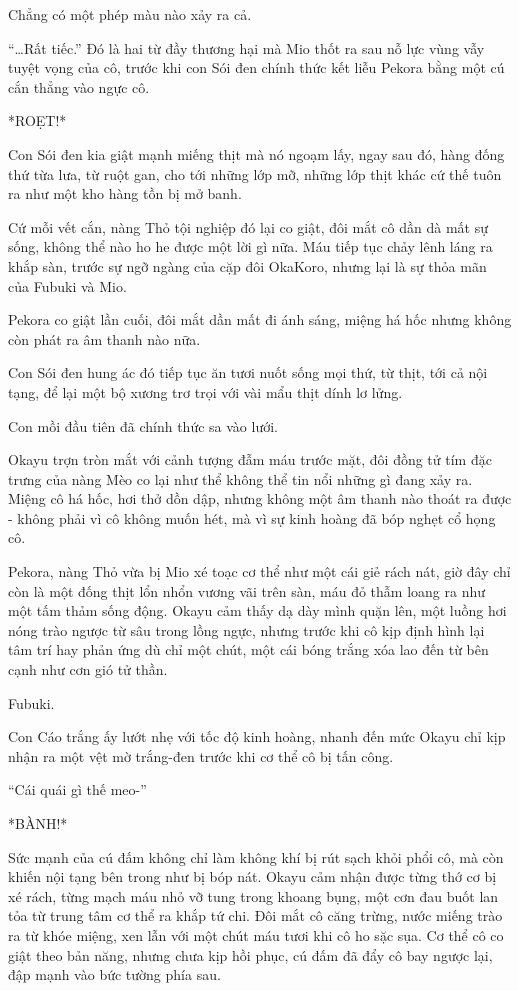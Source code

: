 \documentclass[../main.tex]{subfiles}
\begin{document}
Chẳng có một phép màu nào xảy ra cả.

``\dots Rất tiếc.'' Đó là hai từ đầy thương hại mà Mio thốt ra sau nỗ lực vùng vẫy tuyệt vọng của cô, trước khi con Sói đen chính thức kết liễu Pekora bằng một cú cắn thẳng vào ngực cô.

*ROẸT!*

Con Sói đen kia giật mạnh miếng thịt mà nó ngoạm lấy, ngay sau đó, hàng đống thứ từa lưa, từ ruột gan, cho tới những lớp mỡ, những lớp thịt khác cứ thế tuôn ra như một kho hàng tồn bị mở banh.

Cứ mỗi vết cắn, nàng Thỏ tội nghiệp đó lại co giật, đôi mắt cô dần dà mất sự sống, không thể nào ho he được một lời gì nữa. Máu tiếp tục chảy lênh láng ra khắp sàn, trước sự ngỡ ngàng của cặp đôi OkaKoro, nhưng lại là sự thỏa mãn của Fubuki và Mio.

Pekora co giật lần cuối, đôi mắt dần mất đi ánh sáng, miệng há hốc nhưng không còn phát ra âm thanh nào nữa.

Con Sói đen hung ác đó tiếp tục ăn tươi nuốt sống mọi thứ, từ thịt, tới cả nội tạng, để lại một bộ xương trơ trọi với vài mẩu thịt dính lơ lửng.

Con mồi đầu tiên đã chính thức sa vào lưới.

Okayu trợn tròn mắt với cảnh tượng đẫm máu trước mặt, đôi đồng tử tím đặc trưng của nàng Mèo co lại như thể không thể tin nổi những gì đang xảy ra. Miệng cô há hốc, hơi thở dồn dập, nhưng không một âm thanh nào thoát ra được - không phải vì cô không muốn hét, mà vì sự kinh hoàng đã bóp nghẹt cổ họng cô.

Pekora, nàng Thỏ vừa bị Mio xé toạc cơ thể như một cái giẻ rách nát, giờ đây chỉ còn là một đống thịt lổn nhổn vương vãi trên sàn, máu đỏ thẫm loang ra như một tấm thảm sống động. Okayu cảm thấy dạ dày mình quặn lên, một luồng hơi nóng trào ngược từ sâu trong lồng ngực, nhưng trước khi cô kịp định hình lại tâm trí hay phản ứng dù chỉ một chút, một cái bóng trắng xóa lao đến từ bên cạnh như cơn gió tử thần.

Fubuki.

Con Cáo trắng ấy lướt nhẹ với tốc độ kinh hoàng, nhanh đến mức Okayu chỉ kịp nhận ra một vệt mờ trắng-đen trước khi cơ thể cô bị tấn công.

``Cái quái gì thế meo-''

*BÀNH!*

Sức mạnh của cú đấm không chỉ làm không khí bị rút sạch khỏi phổi cô, mà còn khiến nội tạng bên trong như bị bóp nát. Okayu cảm nhận được từng thớ cơ bị xé rách, từng mạch máu nhỏ vỡ tung trong khoang bụng, một cơn đau buốt lan tỏa từ trung tâm cơ thể ra khắp tứ chi. Đôi mắt cô căng trừng, nước miếng trào ra từ khóe miệng, xen lẫn với một chút máu tươi khi cô ho sặc sụa. Cơ thể cô co giật theo bản năng, nhưng chưa kịp hồi phục, cú đấm đã đẩy cô bay ngược lại, đập mạnh vào bức tường phía sau.
\end{document}
